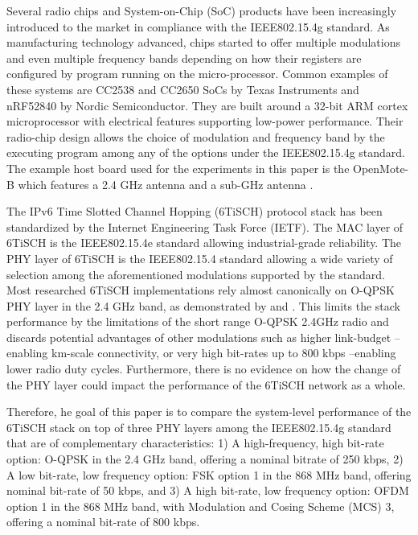 \documentclass[journal]{IEEEtran}
\newcommand{\oqpsk}        {O-QPSK 2.4GHz }
\newcommand{\lorem}        {\textcolor{green}{Lorem ipsum dolor sit amet, consectetur adipiscing elit, sed do eiusmod tempor incididunt ut labore et dolore magna aliqua. Ut enim ad minim veniam, quis nostrud exercitation ullamco laboris nisi ut aliquip ex ea commodo consequat. Duis aute irure dolor in reprehenderit in voluptate velit esse cillum dolore eu fugiat nulla pariatur. Excepteur sint occaecat cupidatat non proident, sunt in culpa qui officia deserunt mollit anim id est laborum.}}
\begin{document}

Several radio chips and System-on-Chip (SoC) products have been increasingly introduced to the market in compliance with the IEEE802.15.4g standard. 
As manufacturing technology advanced, chips started to offer multiple modulations and even multiple frequency bands depending on how their registers are configured by program running on the micro-processor.
Common examples of these systems are CC2538 \cite{12cc2538} and CC2650 \cite{15cc2650} SoCs by Texas Instruments and nRF52840 \cite{19nrf52840} by Nordic Semiconductor. 
They are built around a 32-bit ARM cortex microprocessor with electrical features supporting low-power performance.
Their radio-chip design allows the choice of modulation and frequency band by the executing program among any of the options under the IEEE802.15.4g standard. 
The example host board used for the experiments in this paper is the OpenMote-B which features a 2.4 GHz antenna and a sub-GHz antenna \cite{tusetopenmote}.

The IPv6 Time Slotted Channel Hopping (6TiSCH) protocol stack has been  standardized by the Internet Engineering Task Force (IETF).
The MAC layer of 6TiSCH is the IEEE802.15.4e standard allowing industrial-grade reliability.
The PHY layer of 6TiSCH is the IEEE802.15.4 standard allowing a wide variety of selection among the aforementioned modulations supported by the standard.
Most researched 6TiSCH implementations rely almost canonically on O-QPSK PHY layer in the 2.4 GHz band, as demonstrated by \cite{j.munoz18problem} and \cite{brachmann19ieee}.
This limits the stack performance by the limitations of the short range \oqpsk  radio and discards potential advantages of other modulations such as higher link-budget --enabling km-scale connectivity, or very high bit-rates up to 800 kbps --enabling lower radio duty cycles.
Furthermore, there is no evidence on how the change of the PHY layer could impact the performance of the 6TiSCH network as a whole. 

Therefore, he goal of this paper is to compare the system-level performance of the 6TiSCH stack on top of three PHY layers among the IEEE802.15.4g standard that are of complementary characteristics: 
     1) A high-frequency, high bit-rate option: O-QPSK in the 2.4 GHz band, offering a nominal bitrate of 250 kbps,
     2) A low bit-rate, low frequency option: FSK option 1 in the 868 MHz band, offering nominal bit-rate of 50 kbps, and 
     3) A high bit-rate, low frequency option: OFDM option 1  in the 868 MHz band, with Modulation and Cosing Scheme (MCS) 3, offering a nominal bit-rate of 800 kbps. 
\end{document}
